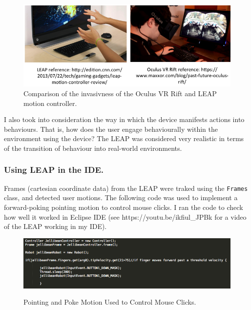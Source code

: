 \documentclass[a4paper, 11pt]{article}
\begin{document}
\begin{figure}[H]
\begin{center}
\includegraphics[scale=0.5]{VRvsLEAP}
\caption{Comparison of the invasivness of the Oculus VR Rift and LEAP motion controller.}
\label{saveScores}
\end{center}
\end{figure}

I also took into consideration the way in which the device manifests actions into behaviours. That is, how does the user engage behaviourally within the environment using the device? The LEAP was considered very realistic in terms of the transition of behaviour into real-world environments.

\subsubsection{Using LEAP in the IDE.}
Frames (cartesian coordinate data) from the LEAP were traked using the \texttt{Frames} class, and detected user motions. The following code was used to implement a forward-poking pointing motion to control mouse clicks. I ran the code to check how well it worked in Eclipse IDE (see https://youtu.be/ikfiul\_JPBk for a video of the LEAP working in my IDE). 

\begin{figure}[H]
\begin{center}
\includegraphics[scale=0.5]{leapCode}\\
\caption{Pointing and Poke Motion Used to Control Mouse Clicks.}
\label{leapCode}
\end{center}
\end{figure}
\end{document}
